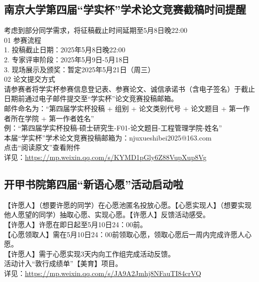 \documentclass[letterpaper, 12pt]{article}
\begin{document}
\begin{multicols}{2}
\subsection{南京大学第四届“学实杯”学术论文竞赛截稿时间提醒} %
考虑到部分同学需求，将征稿截止时间延期至5月8日晚22:00
\\01 参赛流程
\\1. 投稿截止日期：2025年5月8日晚22:00
\\2. 专家评审阶段：2025年5月9日-5月18日
\\3. 现场展示及颁奖：暂定2025年5月21日（周三）
\\02 论文提交方式
\\请参赛者将学实杯参赛信息登记表、参赛论文、诚信承诺书（含电子签名）于截止日期前通过电子邮件提交至“学实杯”论文竞赛投稿邮箱。
\\邮件命名为：“第四届学实杯投稿 + 组别 + 论文类别代号 + 论文题目 + 第一作者所在学院 + 第一作者姓名”
\\例：“第四届学实杯投稿-硕士研究生-F01-论文题目-工程管理学院-姓名”
\\本届“学实杯”学术论文竞赛投稿邮箱为：njuxueshibei2025@163.com
\\点击“阅读原文”查看附件
\\详见：\url{https://mp.weixin.qq.com/s/KYMD1pGly6Z88VupXup8Vg}
\subsection{开甲书院第四届“新语心愿”活动启动啦} %
【许愿人】（想要许愿的同学）在心愿池匿名投放心愿。【心愿实现人】（想要实现他人愿望的同学）抽取心愿、实现心愿。【许愿人】反馈活动感受。
\\【许愿人】许愿在即日起至5月10日24：00前。
\\【心愿领取人】需在5月10日24：00前领取心愿，领取心愿后一周内完成许愿人心愿。
\\【许愿人】需于心愿实现3天内向工作组完成活动反馈。
\\活动计入“敦行成绩单”【美育】项目。
\\详见：\url{https://mp.weixin.qq.com/s/JA9A2Jmhj8NFauTI84crVQ}

\end{multicols}
\end{document}
